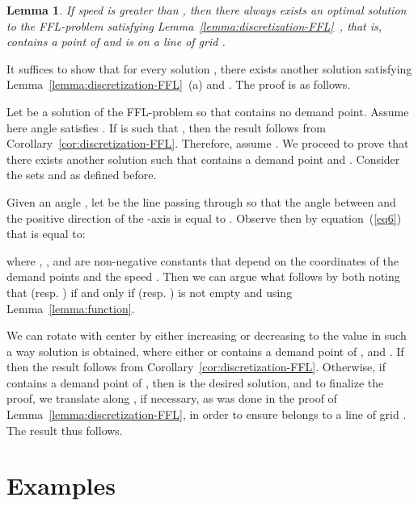 \documentclass[11pt,a4paper,oneside,onecolumn]{article}
\newtheorem{lemma}[theorem]{Lemma}
\def\QED{\ensuremath{{\square}}}
\def\markatright#1{\leavevmode\unskip\nobreak\quad\hspace*{\fill}{#1}}
\newenvironment{proof}
{\begin{trivlist}\item[\hskip\labelsep{\bf Proof.}]}
{\markatright{\QED}\end{trivlist}}
\begin{document}
\begin{lemma}\label{lemma:discretization-FFL-2}
If speed  is greater than , then there always exists an optimal solution 
to the FFL-problem satisfying
Lemma~\ref{lemma:discretization-FFL}~, that is,  contains a
point of  and  is on a line of grid .
\end{lemma}
\begin{proof}
It suffices to show that for every solution , there
exists another solution  satisfying
Lemma~\ref{lemma:discretization-FFL}~(a) and
. The proof is as follows.

Let  be a solution of the FFL-problem so that 
contains no demand point. Assume here angle  satisfies
. If  is such that
, then the result follows from
Corollary~\ref{cor:discretization-FFL}. Therefore, assume
.
We proceed to prove that there exists another solution
 such that  contains a demand point and
. Consider the sets  and
 as defined before.

Given an angle , let 
be the line passing through  so that the angle between
 and the positive direction of the -axis is equal to
. Observe then by equation~(\ref{eq6}) that  is equal to:

where , , and  are non-negative constants that depend on
the coordinates of the demand points and the speed . Then we can
argue what follows by both noting that  (resp. ) if and only if
 (resp. ) is not empty and using
Lemma~\ref{lemma:function}.

We can rotate  with center  by either increasing or decreasing
 to the value  in such
a way solution  is obtained, where either
 or  contains a demand point of
, and . If
 then the result follows from
Corollary~\ref{cor:discretization-FFL}. Otherwise, if 
contains a demand point of , then
 is the desired solution, and to
finalize the proof, we translate  along , if necessary, as
was done in the proof of Lemma~\ref{lemma:discretization-FFL}, in
order to ensure  belongs to a line of grid . The result thus
follows.
\end{proof}

\section{Examples}\label{section:experimental}
\end{document}
